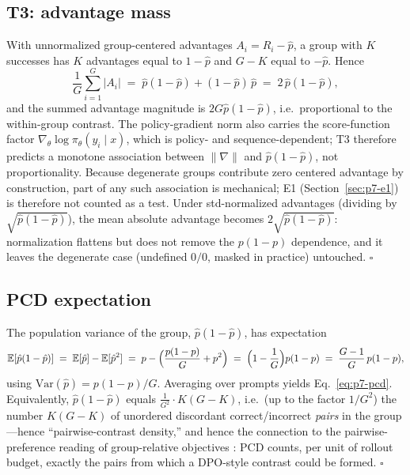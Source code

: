 \subsection{T3: advantage mass}
\label{sec:p7-appendix-t3}
With unnormalized group-centered advantages $A_i = R_i - \hat p$, a group
with $K$ successes has $K$ advantages equal to $1 - \hat p$ and $G - K$
equal to $-\hat p$. Hence
\begin{equation}
  \frac{1}{G} \sum_{i=1}^{G} |A_i|
  \;=\; \hat p (1 - \hat p) + (1 - \hat p)\, \hat p
  \;=\; 2\, \hat p (1 - \hat p),
\end{equation}
and the summed advantage magnitude is $2 G \hat p(1-\hat p)$, i.e.\
proportional to the within-group contrast. The policy-gradient norm also
carries the score-function factor
$\nabla_\theta \log \pi_\theta(y_i \mid x)$, which is policy- and
sequence-dependent; T3 therefore predicts a monotone association between
$\|\nabla\|$ and $\hat p(1-\hat p)$, not proportionality. Because degenerate
groups contribute zero centered advantage by construction, part of any such
association is mechanical; E1 (Section~\ref{sec:p7-e1}) is therefore not
counted as a test. Under
std-normalized advantages (dividing by
$\sqrt{\hat p(1-\hat p)}$), the mean absolute advantage becomes
$2\sqrt{\hat p(1-\hat p)}$: normalization flattens but does not remove the
$p(1-p)$ dependence, and it leaves the degenerate case (undefined $0/0$,
masked in practice) untouched. \hfill$\square$

\subsection{PCD expectation}
\label{sec:p7-appendix-pcd}
The population variance of the group, $\hat p(1-\hat p)$, has expectation
\begin{equation}
  \mathbb{E}[\hat p(1-\hat p)]
  \;=\; \mathbb{E}[\hat p] - \mathbb{E}[\hat p^2]
  \;=\; p - \Bigl(\frac{p(1-p)}{G} + p^2\Bigr)
  \;=\; \Bigl(1 - \frac{1}{G}\Bigr) p (1-p)
  \;=\; \frac{G-1}{G}\, p(1-p),
\end{equation}
using $\mathrm{Var}(\hat p) = p(1-p)/G$. Averaging over prompts yields
Eq.~\eqref{eq:p7-pcd}. Equivalently, $\hat p(1-\hat p)$ equals
$\frac{1}{G^2} \cdot K(G-K)$, i.e.\ (up to the factor $1/G^2$) the number
$K(G-K)$ of unordered discordant correct/incorrect \emph{pairs} in the group---hence
``pairwise-contrast density,'' and hence the connection to the
pairwise-preference reading of group-relative objectives
\citep{wu2025grpodpo, rafailov2024direct}: PCD counts, per unit of rollout
budget, exactly the pairs from which a DPO-style contrast could be formed.
\hfill$\square$

